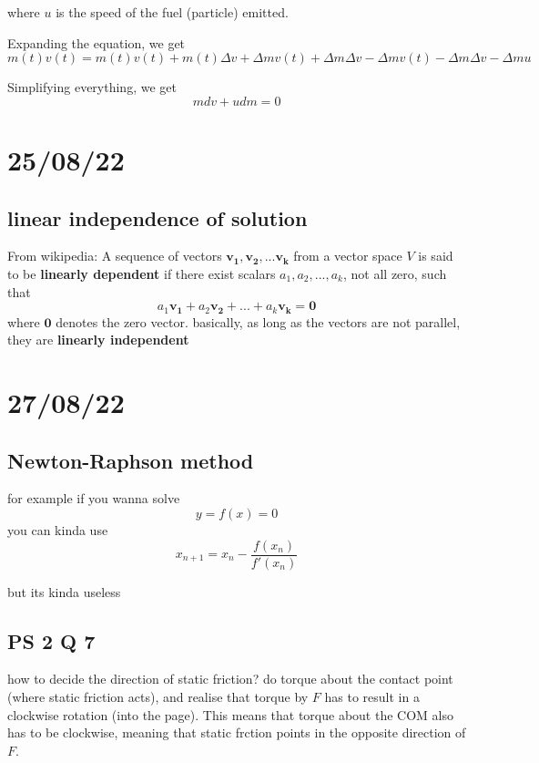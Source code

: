 where $u$ is the speed of the fuel (particle) emitted.

Expanding the equation, we get
\begin{equation}
    m(t)v(t)=m(t)v(t)+m(t)\Delta v+\Delta m v(t)+\Delta m \Delta v -\Delta m v(t)-\Delta m \Delta v - \Delta m u 
\end{equation}

Simplifying everything, we get 
\begin{equation}
    m dv+u dm = 0
\end{equation}

\section{25/08/22}
\subsection{linear independence of solution}
From wikipedia: A sequence of vectors $\mathbf{v_1},\mathbf{v_2},...\mathbf{v_k}$ from a vector space $V$ is said to be \textbf{linearly dependent} if there exist scalars $a_1,a_2,...,a_k$, not all zero, such that 
\begin{equation}
    a_1 \mathbf{v_1}+a_2 \mathbf{v_2}+...+a_k \mathbf{v_k}= \mathbf{0}
\end{equation}
where $\mathbf{0}$ denotes the zero vector. 
basically, as long as the vectors are not parallel, they are \textbf{linearly independent}

\section{27/08/22}
\subsection{Newton-Raphson method}
for example if you wanna solve
\begin{equation}
    y=f(x)=0
\end{equation}
you can kinda use
\begin{equation}
    x_{n+1}=x_n-\frac{f(x_n)}{f'(x_n)}
\end{equation}

 but its kinda useless

 \subsection{PS 2 Q 7}
 how to decide the direction of static friction? do torque about the contact point (where static friction acts), and realise that torque by $F$ has to result in a clockwise rotation (into the page). This means that torque about the COM also has to be clockwise, meaning that static frction points in the opposite direction of $F$. 

